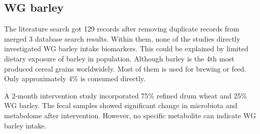 \subsection{WG barley}
The literature search got 129 records after removing duplicate records from merged 3 database search results. Within them, none of the studies directly investigated WG barley intake biomarkers. This could be explained by limited dietary exposure of barley in population. Although barley is the 4th most produced cereal grains worldwidely. Most of them is used for brewing or feed. Only approximately 4\% is consumed directly\cite{Baik2008}.

A 2-month intervention study\cite{DeAngelis2015} incorporated 75\% refined drum wheat and 25\% WG barley. The fecal samples showed significant change in microbiota and metabolome after intervention\cite{DeAngelis2015}. However, no specific metabolite can indicate WG barley intake.

